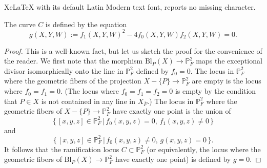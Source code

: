 \documentclass[10pt,a4paper]{amsart}
\newcommand{\PP}{\mathbb P}
\begin{document}
XeLaTeX with its default Latin Modern text font, reports no missing character.
\begin{lem}\label{Lemma:defining equation of ramified locus}
The curve
$C$ is defined by the equation
\[
g(X, Y, W):=f_1(X, Y, W)^2-4f_0(X, Y, W)f_2(X, Y, W)=0.
\]
\end{lem}

\begin{proof}
This is a well-known fact, but let us sketch the proof for the convenience of the reader.
We first note that the morphism
$\mathrm{Bl}_P (X) \to \PP^2_{F}$ maps the exceptional divisor isomorphically onto the line in $\PP^2_{F}$ defined by $f_0=0$.
The locus in $\PP^2_{F}$ where the geometric fibers of the projection $X - \{ P \} \to \PP^2_{F}$ are empty is the locus where $f_0=f_1=0$.
(The locus where $f_0=f_1=f_2=0$ is empty by the condition that $P \in X$ is not contained in any line in $X_{\overline{F}}$.)
The locus in $\PP^2_{F}$ where the geometric fibers of $X - \{ P \} \to \PP^2_{F}$ have exactly one point is the union of 
\[
\{ \, [x, y, z] \in \PP^2_{F} \, \vert \, f_0(x, y, z)=0, \, f_1(x, y, z) \neq 0 \, \}
\]
and
\[
\{ \, [x, y, z] \in \PP^2_{F} \, \vert \, f_0(x, y, z) \neq 0, \, g(x, y, z) = 0 \, \}.
\]
It follows that the ramification locus $C \subset \PP^2_{F}$ (or equivalently, the locus where the geometric fibers of
$\mathrm{Bl}_P (X) \to \PP^2_{F}$
have exactly one point) is defined by $g=0$.
\end{proof}
\end{document}
